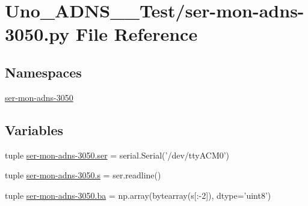 \hypertarget{ser-mon-adns-3050_8py}{\section{Uno\-\_\-\-A\-D\-N\-S\-\_\-\_\-\-Test/ser-\/mon-\/adns-\/3050.py File Reference}
\label{ser-mon-adns-3050_8py}
}
\subsection*{Namespaces}
\begin{DoxyCompactItemize}
\item 
\hyperlink{namespaceser-mon-adns-3050}{ser-\/mon-\/adns-\/3050}
\end{DoxyCompactItemize}
\subsection*{Variables}
\begin{DoxyCompactItemize}
\item 
tuple \hyperlink{namespaceser-mon-adns-3050_aeb75b8d2274f52835b8a3c670650abc1}{ser-\/mon-\/adns-\/3050.\-ser} = serial.\-Serial('/dev/tty\-A\-C\-M0')
\item 
tuple \hyperlink{namespaceser-mon-adns-3050_a292f31fb2fd0e796b495e18bddd6371c}{ser-\/mon-\/adns-\/3050.\-s} = ser.\-readline()
\item 
tuple \hyperlink{namespaceser-mon-adns-3050_a0e229bbf6215af5bfc987333a7c5d3ab}{ser-\/mon-\/adns-\/3050.\-ba} = np.\-array(bytearray(s\mbox{[}\-:-\/2\mbox{]}), dtype='uint8')
\end{DoxyCompactItemize}
